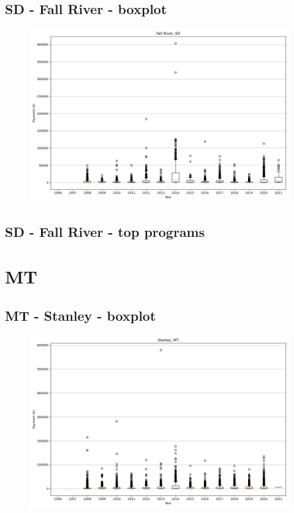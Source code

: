 \subsection*{SD - Fall River - boxplot}
\begin{figure}[h]
\centering
\includegraphics[width=7in]{../output/boxplots/counties/Fall River-SD_boxplot.png}
\end{figure}


\subsection*{SD - Fall River - top programs}

\newpage
\section*{MT}
\subsection*{MT - Stanley - boxplot}
\begin{figure}[h]
\centering
\includegraphics[width=7in]{../output/boxplots/counties/Stanley-MT_boxplot.png}
\end{figure}


